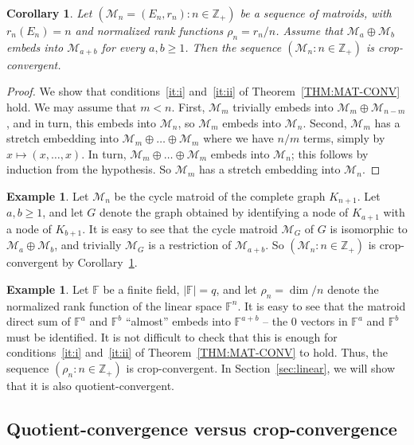 \documentclass[10pt]{article}
\theoremstyle{plain}
\newtheorem{cor}[thm]{Corollary}
\theoremstyle{definition}
\newtheorem{ex}[thm]{Example}
\newcommand{\bbZ}{\mathbb{Z}}
\newcommand{\bbF}{\mathbb{F}}
\newcommand{\MM}{\mathcal{M}}
\begin{document}
\begin{cor}\label{COR:MAT-CONV}
Let $(\MM_n=(E_n,r_n)\colon n\in\bbZ_+)$ be a sequence of matroids, with
$r_n(E_n)=n$ and normalized rank functions $\rho_n=r_n/n$. Assume that
$\MM_a\oplus\MM_b$ embeds into $\MM_{a+b}$ for every $a,b\ge 1$. Then the
sequence $(\MM_n\colon n\in\bbZ_+)$ is crop-convergent.
\end{cor}
\begin{proof}
We show that conditions~\ref{it:i} and~\ref{it:ii} of Theorem~\ref{THM:MAT-CONV} hold. We
may assume that $m<n$. First, $\MM_m$ trivially embeds into $\MM_m\oplus
\MM_{n-m}$, and in turn, this embeds into $\MM_n$, so $\MM_m$ embeds into
$\MM_n$. Second, $\MM_m$ has a stretch embedding into $\MM_m\oplus\dots\oplus
\MM_m$ where we have $n/m$ terms, simply by $x\mapsto(x,\dots,x)$. In turn,
$\MM_m\oplus\dots\oplus \MM_m$ embeds into $\MM_n$; this follows by induction
from the hypothesis. So $\MM_m$ has a stretch embedding into $\MM_n$.
\end{proof}

\begin{ex}\label{EXA:COMPLETE-SCONV}
Let $\MM_n$ be the cycle matroid of the complete graph $K_{n+1}$. Let $a,b\ge
1$, and let $G$ denote the graph obtained by identifying a node of $K_{a+1}$
with a node of $K_{b+1}$. It is easy to see that the cycle matroid $\MM_G$ of
$G$ is isomorphic to $\MM_a\oplus\MM_b$, and trivially $\MM_G$ is a
restriction of $\MM_{a+b}$. So $(\MM_n\colon n\in\bbZ_+)$ is crop-convergent by
Corollary~\ref{COR:MAT-CONV}.
\end{ex}

\begin{ex}\label{EXA:LINSPACE-SCONV}
Let $\bbF$ be a finite field, $|\bbF|=q$, and let $\rho_n=\dim/n$ denote the
normalized rank function of the linear space $\bbF^n$. It is easy to see that the
matroid direct sum of $\bbF^a$ and $\bbF^b$ ``almost'' embeds into $\bbF^{a+b}$ -- the $0$ vectors in $\bbF^a$ and $\bbF^b$ must be identified. It is not difficult to check that this is enough for conditions~\ref{it:i} and~\ref{it:ii} of Theorem~\ref{THM:MAT-CONV} to hold. Thus,
the sequence $(\rho_n\colon n\in\bbZ_+)$ is crop-convergent. In Section~\ref{sec:linear}, we will show that it is also quotient-convergent.
\end{ex}

\subsection{Quotient-convergence versus crop-convergence}
\label{sec:quotientvscrop}
\end{document}

